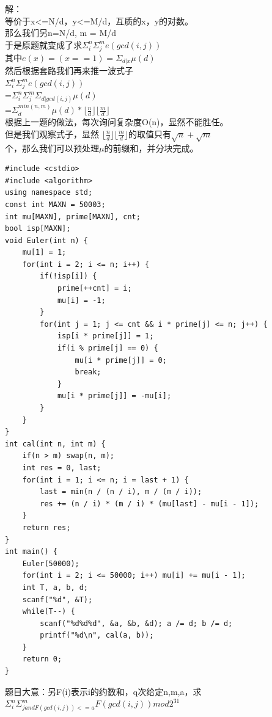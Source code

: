 \documentclass[10pt]{ctexart}
\begin{document}
{解：\\
等价于x<=N/d，y<=M/d，互质的x，y的对数。\\
那么我们另n=N/d, m = M/d\\
于是原题就变成了求$\Sigma_i^n\Sigma_j^me(gcd(i, j))$\\
其中$e(x) = (x == 1) = \Sigma_{d | x} \mu(d)$\\
然后根据套路我们再来推一波式子\\
$\Sigma_i^n\Sigma_j^me(gcd(i, j))$\\
=$\Sigma_i^n\Sigma_j^m\Sigma_{d|gcd(i, j)} \mu(d)$\\
=$\Sigma_d^{min(n, m)}\mu(d) * \lfloor\frac{n}{d}\rfloor\lfloor\frac{m}{d}\rfloor$\\
根据上一题的做法，每次询问复杂度O(n)，显然不能胜任。\\
但是我们观察式子，显然 $\lfloor\frac{n}{d}\rfloor\lfloor\frac{m}{d}\rfloor$的取值只有$\sqrt{n} + \sqrt{m}$\\个，那么我们可以预处理$\mu$的前缀和，并分块完成。
\begin{lstlisting}
#include <cstdio>
#include <algorithm>
using namespace std;
const int MAXN = 50003;
int mu[MAXN], prime[MAXN], cnt;
bool isp[MAXN];
void Euler(int n) {
    mu[1] = 1;
    for(int i = 2; i <= n; i++) {
        if(!isp[i]) {
            prime[++cnt] = i;
            mu[i] = -1;
        }
        for(int j = 1; j <= cnt && i * prime[j] <= n; j++) {
            isp[i * prime[j]] = 1;
            if(i % prime[j] == 0) {
                mu[i * prime[j]] = 0;
                break;
            }
            mu[i * prime[j]] = -mu[i];
        }
    }
}
int cal(int n, int m) {
    if(n > m) swap(n, m);
    int res = 0, last;
    for(int i = 1; i <= n; i = last + 1) {
        last = min(n / (n / i), m / (m / i));
        res += (n / i) * (m / i) * (mu[last] - mu[i - 1]);
    }
    return res;
}
int main() {
    Euler(50000);
    for(int i = 2; i <= 50000; i++) mu[i] += mu[i - 1];
    int T, a, b, d;
    scanf("%d", &T);
    while(T--) {
        scanf("%d%d%d", &a, &b, &d); a /= d; b /= d;
        printf("%d\n", cal(a, b));
    }
    return 0;
}
\end{lstlisting}

题目大意：另F(i)表示i的约数和，q次给定n,m,a，求$\Sigma_i^n\Sigma_{j and F(gcd(i, j)) <= a}^m F(gcd(i, j)) mod 2 ^ {31}$\\

}
\end{document}
